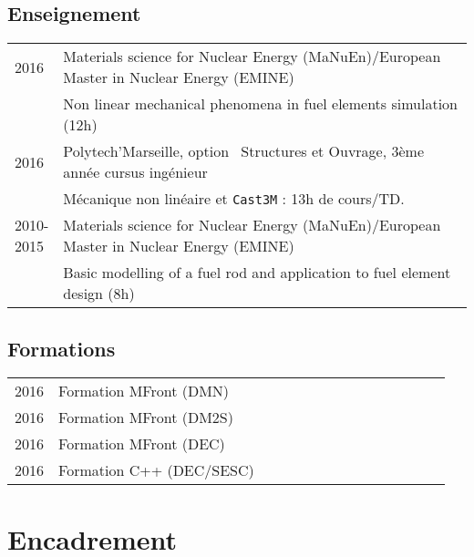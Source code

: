\documentclass[11pt,a4paper]{moderncv}
\let\origsubsection\subsection%
\let\subsection\section%
\let\subsection\origsubsection%
\begin{document}
\subsection{Enseignement}

\begin{tabular}[htbp]{p{0.1\linewidth}p{0.9\linewidth}}
  2016      & Materials science for Nuclear Energy (MaNuEn)/European Master in Nuclear Energy (EMINE) \\
            & Non linear mechanical phenomena in fuel elements simulation (12h) \\
  2016      & Polytech’Marseille, option \og{}~Structures et Ouvrage\fg{}, 3ème année cursus ingénieur\\
            & Mécanique non linéaire et \texttt{Cast3M} : 13h de cours/TD. \\
  {\tiny 2010-2015} & Materials science for Nuclear Energy (MaNuEn)/European Master in Nuclear Energy (EMINE) \\
            & Basic modelling of a fuel rod and application to fuel element design (8h) \\
\end{tabular}

\subsection{Formations}

\begin{tabular}[htbp]{p{0.1\linewidth}p{0.9\linewidth}}
  2016      & Formation MFront (DMN) \\
  2016      & Formation MFront (DM2S) \\
  2016      & Formation MFront (DEC) \\
  2016      & Formation C++ (DEC/SESC) \\
\end{tabular}

\section{Encadrement}
\end{document}
